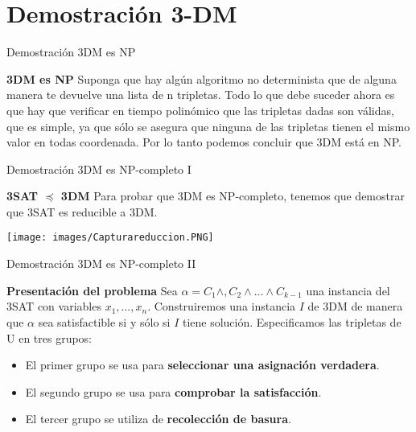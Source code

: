 \documentclass[10pt, mathserif, profesionalfont]{beamer}
\begin{document}
	
	
	
	\section{Demostración 3-DM}
	
	\begin{frame}{Demostración 3DM es NP}
		
		\begin{block}{\textbf{3DM es NP}}
			Suponga que hay algún algoritmo no determinista que de alguna manera te devuelve una lista de n tripletas. Todo lo que debe suceder ahora es que hay que verificar en tiempo polinómico que las tripletas dadas son válidas, que es simple, ya que sólo se asegura que ninguna de las tripletas tienen el mismo valor en todas coordenada. Por lo tanto podemos concluir que 3DM está en NP.	
		\end{block}
		
	\end{frame}
	
	
	\begin{frame}{Demostración 3DM es NP-completo I}
		
		\begin{block}{\textbf{3SAT $\preceq$ 3DM}}
			Para probar que 3DM es NP-completo, tenemos que demostrar que 3SAT es reducible a 3DM.
			
		\end{block}	
		
		\begin{center}
			\texttt{[image: images/Capturareduccion.PNG]}
		\end{center}	
		
	\end{frame}
	
	
	\begin{frame}{Demostración 3DM es NP-completo II}
		\begin{block}{\textbf{Presentación del problema}}
			Sea $\alpha = C_1 \wedge, C_2 \wedge \dots \wedge C_{k-1}$ una instancia del 3SAT con variables $x_1, \dots, x_n$.
			Construiremos una instancia $I$ de 3DM de manera que $\alpha$ sea satisfactible si y sólo si $I$ tiene solución. Especificamos las tripletas de U en tres grupos: 
			\begin{itemize}
				\item El primer grupo se usa para \textbf{seleccionar una asignación verdadera}. 
				\item El segundo grupo se usa para \textbf{comprobar la satisfacción}. 
				\item El tercer grupo se utiliza de \textbf{recolección de basura}.
			\end{itemize}
			
		\end{block}
	\end{frame}
	
\end{document}

